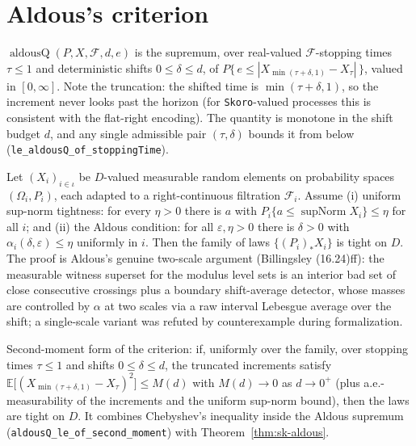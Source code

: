 \section{Aldous's criterion}

\begin{definition}\label{def:sk-aldousq}
  \leanok
  $\operatorname{aldousQ}(P,X,\mathcal{F},d,e)$ is the supremum, over real-valued
  $\mathcal{F}$-stopping times $\tau\le 1$ and deterministic shifts $0\le\delta\le d$, of
  $P\{\,e\le|X_{\min(\tau+\delta,1)}-X_\tau|\,\}$, valued in $[0,\infty]$.  Note the
  truncation: the shifted time is $\min(\tau+\delta,1)$, so the increment never looks past
  the horizon (for \texttt{Skoro}-valued processes this is consistent with the flat-right
  encoding).  The quantity is monotone in the shift budget $d$, and any single admissible
  pair $(\tau,\delta)$ bounds it from below
  (\texttt{le\_aldousQ\_of\_stoppingTime}).
\end{definition}

\begin{theorem}\label{thm:sk-aldous}
  \leanok
  Let $(X_i)_{i\in\iota}$ be $D$-valued measurable random elements on probability spaces
  $(\Omega_i,P_i)$, each adapted to a right-continuous filtration $\mathcal{F}_i$.  Assume
  (i) uniform sup-norm tightness: for every $\eta>0$ there is $a$ with
  $P_i\{a\le\operatorname{supNorm}X_i\}\le\eta$ for all $i$; and (ii) the Aldous
  condition: for all $\varepsilon,\eta>0$ there is $\delta>0$ with
  $\alpha_i(\delta,\varepsilon)\le\eta$ uniformly in $i$.  Then the family of laws
  $\{(P_i)_*X_i\}$ is tight on $D$.  The proof is Aldous's genuine two-scale argument
  (Billingsley (16.24)ff): the measurable witness superset for the modulus level sets is
  an interior bad set of close consecutive crossings plus a boundary shift-average
  detector, whose masses are controlled by $\alpha$ at two scales via a raw interval
  Lebesgue average over the shift; a single-scale variant was refuted by counterexample
  during formalization.
\end{theorem}

\begin{theorem}\label{thm:sk-aldous-moment}
  \leanok
  Second-moment form of the criterion: if, uniformly over the family, over stopping times
  $\tau\le 1$ and shifts $0\le\delta\le d$, the truncated increments satisfy
  $\mathbb{E}\bigl[(X_{\min(\tau+\delta,1)}-X_\tau)^2\bigr]\le M(d)$ with
  $M(d)\to 0$ as $d\to 0^+$ (plus a.e.-measurability of the increments and the uniform
  sup-norm bound), then the laws are tight on $D$.  It combines Chebyshev's inequality
  inside the Aldous supremum (\texttt{aldousQ\_le\_of\_second\_moment}) with
  Theorem~\ref{thm:sk-aldous}.
\end{theorem}

